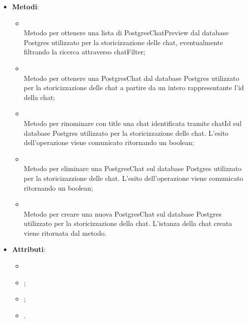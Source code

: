 \documentclass[10pt, a4paper]{article}
\begin{document}
\label{PostgresORMDettaglio}
\begin{itemize}
    \item \textbf{Metodi}:
    \begin{itemize}
        \item {}\\
        Metodo per ottenere una lista di PostgresChatPreview dal database Postgres utilizzato per la storicizzazione delle chat, eventualmente filtrando la ricerca attraverso chatFilter;
        \item {}\\
        Metodo per ottenere una PostgresChat dal database Postgres utilizzato per la storicizzazione delle chat a partire da un intero rappresentante l'id della chat;
        \item {}\\
        Metodo per rinominare con title una chat identificata tramite chatId sul database Postgres utilizzato per la storicizzazione delle chat. L'esito dell'operazione viene comunicato ritornando un boolean;  
        \item {}\\
        Metodo per eliminare una PostgresChat sul database Postgres utilizzato per la storicizazzione delle chat. L'esito dell'operazione viene comunicato ritornando un boolean;        
        \item {}\\
        Metodo per creare una nuova PostgresChat sul database Postgres utilizzato per la storicizzazione della chat. L'istanza della chat creata viene ritornata dal metodo.
    \end{itemize}
\end{itemize}

\label{PostgresChatDettaglio}
\begin{itemize}
    \item \textbf{Attributi}:
    \begin{itemize}
        \item {}
        \item {};
        \item {};
        \item {}.
    \end{itemize}
\end{itemize}
\end{document}
